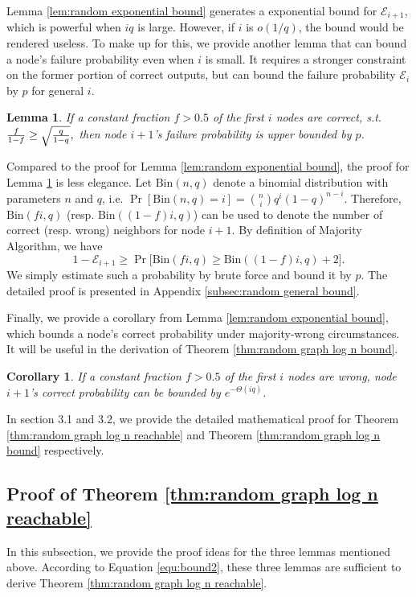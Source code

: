 \documentclass[a4paper,UKenglish]{lipics}
\newtheorem{lem}[thm]{Lemma}
\newtheorem{cor}[thm]{Corollary}
\theoremstyle{definition}
\begin{document}
Lemma \ref{lem:random exponential bound} generates a exponential bound for $\mathcal{E}_{i+1}$, which is powerful when $iq$ is large.
However, if $i$ is $o(1/q)$, the bound would be rendered useless.
To make up for this, we provide another lemma that can bound a node's failure probability even when $i$ is small.
It requires a stronger constraint on the former portion of correct outputs,
	but can bound the failure probability $\mathcal{E}_i$ by $p$ for general $i$.

\begin{lem}
\label {lem:random general bound}
If a constant fraction $f > 0.5$ of the first $i$ nodes are correct, s.t.
$
	{f\over 1-f} \ge \sqrt{q\over 1-q},
$
then node $i+1$'s failure probability is upper bounded by $p$. 
\end{lem}

Compared to the proof for Lemma \ref{lem:random exponential bound}, 
	the proof for Lemma \ref{lem:random general bound} is less elegance.
Let $\text{Bin}(n,q)$ denote a binomial distribution with parameters $n$ and $q$, i.e.
$
	\Pr[\text{Bin}(n, q) = i]
=
	{n\choose i} q^{i}(1-q)^{n-i}.
$
Therefore, $\text{Bin}(fi, q)$ (resp. $\text{Bin}((1-f)i, q)$) can be used to denote the number of correct (resp. wrong) neighbors for node $i+1$.
By definition of Majority Algorithm, we have
\begin{equation*}
	1 - \mathcal{E}_{i+1}
\ge
	\Pr\Big[ 
		\text{Bin}(fi, q) \ge \text{Bin}((1-f)i, q) + 2 
	\Big].
\end{equation*}
We simply estimate such a probability by brute force and bound it by $p$.
The detailed proof is presented in Appendix \ref{subsec:random general bound}.
	
Finally, we provide a corollary from Lemma \ref{lem:random exponential bound},
	which bounds a node's correct probability under majority-wrong circumstances.
It will be useful in the derivation of Theorem \ref{thm:random graph log n bound}.
\begin{cor}
\label {cor:successfori}
If a constant fraction $f > 0.5$ of the first $i$ nodes are wrong, 
	node $i+1$'s correct probability can be bounded by $e^{-\Theta(iq)}$. 
\end{cor}
In section 3.1 and 3.2, we provide the detailed mathematical proof for 
	Theorem \ref{thm:random graph log n reachable} and Theorem \ref{thm:random graph log n bound} respectively.




\subsection {Proof of Theorem \ref{thm:random graph log n reachable}}
In this subsection, we provide the proof ideas for the three lemmas mentioned above.
According to Equation \eqref{equ:bound2}, these three lemmas are sufficient to derive Theorem \ref{thm:random graph log n reachable}.
\end{document}
